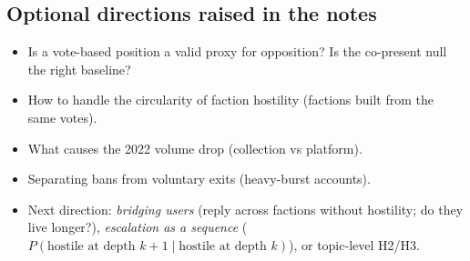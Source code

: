 \documentclass[11pt,a4paper]{article}
\begin{document}
\subsection{Optional directions raised in the notes}
\begin{itemize}
  \item Is a vote-based position a valid proxy for opposition? Is the co-present null the right baseline?
  \item How to handle the circularity of faction hostility (factions built from the same votes).
  \item What causes the 2022 volume drop (collection vs platform).
  \item Separating bans from voluntary exits (heavy-burst accounts).
  \item Next direction: \emph{bridging users} (reply across factions without hostility; do they live longer?), \emph{escalation as a sequence} ($P(\text{hostile at depth }k+1\mid\text{hostile at depth }k)$), or topic-level H2/H3.
\end{itemize}

\end{document}

